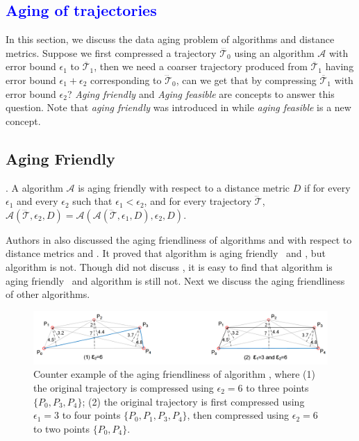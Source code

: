 
\textcolor{blue}{\section{Aging of trajectories}}

In this section, we discuss the data aging problem of \lsa algorithms and distance metrics.
%
Suppose we first compressed a trajectory $\dddot{\mathcal{T}_0}$ using an \lsa algorithm $\mathcal{A}$ with error bound $\epsilon_1$ to $\overline{\mathcal{T}}_1$, then we need a coarser trajectory produced from $\overline{\mathcal{T}}_1$  having error bound $\epsilon_1 + \epsilon_2$ corresponding to $\dddot{\mathcal{T}}_0$, can we get that by compressing $\overline{\mathcal{T}}_1$ with error bound $\epsilon_2$?  \emph{Aging friendly \cite{Cao:Spatio}} and \emph{Aging feasible} are concepts to answer this question. Note that \emph{aging friendly} was introduced in \cite{Cao:Spatio} while \emph{aging feasible} is a new concept.

\subsection{Aging Friendly}
	
. {A \lsa algorithm $\mathcal{A}$ is aging friendly with respect to a distance metric $D$ if for every $\epsilon_1$ and every $\epsilon_2$ such that $\epsilon_1 < \epsilon_2$, and for every trajectory $\dddot{\mathcal{T}}$, $\mathcal{A}(\dddot{\mathcal{T}}, \epsilon_2, D)= \mathcal{A}(\mathcal{A}(\dddot{\mathcal{T}}, \epsilon_1, D), \epsilon_2, D)$.}

	
Authors in \cite{Cao:Spatio} also discussed the aging friendliness of algorithms \opt and \dpa with respect to distance metrics \ped and \sed. It proved that algorithm \dpa is aging friendly \wrt~\ped and \sed, but algorithm \opt is not. 
Though \cite{Cao:Spatio} did not discuss \dad, it is easy to find that algorithm \dpa is aging friendly \wrt~\dad and algorithm \opt is still not. Next we discuss the aging friendliness of other algorithms.


\begin{figure}[tb!]
	\centering
	\includegraphics[scale=0.66]{Figures/Fig-aging-pavlidis.png}

	\caption{\small Counter example of the aging friendliness of algorithm \tpa, where (1) the original trajectory is compressed using $\epsilon_2=6$ to three points $\{P_0, P_3, P_4\}$; (2) the original trajectory is first compressed using $\epsilon_1=3$ to four points $\{P_0, P_1, P_3, P_4\}$, then compressed using $\epsilon_2=6$ to two points $\{P_0, P_4\}$. }
	\vspace{-2ex}
	\label{fig:aging-pavlidis}
\end{figure}


